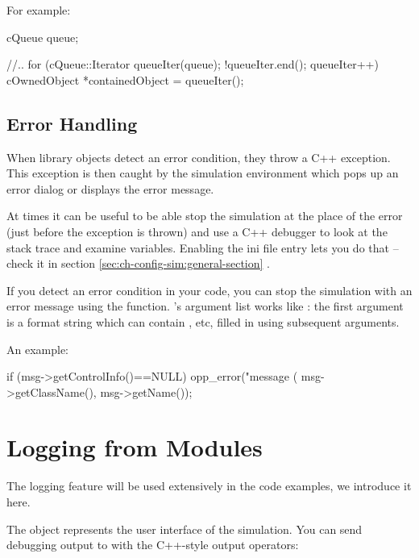 For example:

\begin{cpp}
cQueue queue;

//..
for (cQueue::Iterator queueIter(queue); !queueIter.end(); queueIter++)
{
    cOwnedObject *containedObject = queueIter();
}
\end{cpp}



\subsection{Error Handling}


When library objects detect an error condition, they throw a C++ exception.
This exception is then caught by the simulation environment which pops up
an error dialog or displays the error message.

At times it can be useful to be able stop the simulation at the place of the error
(just before the exception is thrown) and use a C++ debugger to look
at the stack trace and examine variables. Enabling the 
ini file entry lets you do that -- check it in section
\ref{sec:ch-config-sim:general-section}  .

If you detect an error condition in your code, you can stop the
simulation with an error message using the  function.
's argument list works like : the
first argument is a format string which can contain ,  etc,
filled in using subsequent arguments.

An example:

\begin{cpp}
if (msg->getControlInfo()==NULL)
    opp_error("message (%
              msg->getClassName(), msg->getName());
\end{cpp}



\section{Logging from Modules}

The logging feature will be used extensively in the code examples,
we introduce it here.

The  object represents the user interface of the
simulation.  You can send debugging output to  with the C++-style
output operators:

